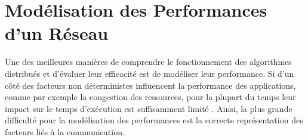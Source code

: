 \begin{resume}
%
%
%
%

\end{resume}

\section{Modélisation des Performances d'un Réseau\label{sec:reseaux-model}}


Une des meilleures manières de comprendre le fonctionnement des algorithmes
distribués et d'évaluer leur efficacité est de modéliser leur performance. Si d'un côté des facteurs non
déterministes influencent la performance des applications,
comme par exemple la congestion des ressources, pour la plupart du
temps leur impact sur le temps d'exécution est suffisamment
limité \cite{Grove03}. Ainsi, la plus grande difficulté pour la modélisation
des performances est la correcte représentation des facteurs liés
à la communication.  

